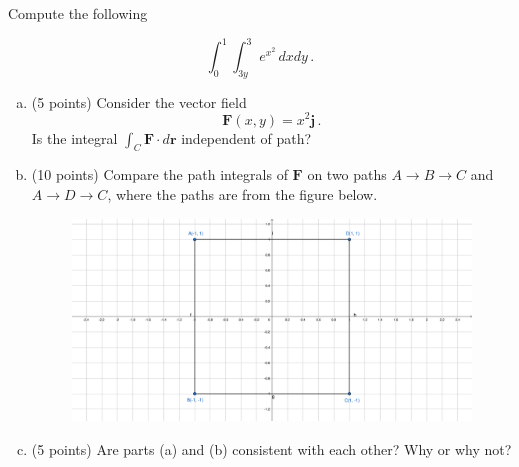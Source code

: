 \documentclass[12pt]{article}
\newcommand{\vect}{\mathbf}
\begin{document}
\newpage
\begin{problem}[16 points]
    Compute the following

            $$\int_0^1 \int_{3y}^3 e^{x^2} \, dx dy \,.$$

\end{problem}

\newpage
\begin{problem}
    \begin{enumerate}[(a)]
        \item (5 points) Consider the vector field
            \begin{equation*}
                \vect{F}(x,y) = x^2 \vect{j} \,.
            \end{equation*}
            Is the integral $\int_C \vect{F} \cdot d\vect{r}$ independent of path?

        \item (10 points)
            Compare
            the path integrals of $\vect{F}$ on two paths $A\to B \to C$ and $A\to D \to C$,
            where the paths are from the figure below.
            \begin{figure}[!h]
            \includegraphics[width=1.5\textwidth]{paths.pdf}
            \end{figure}
    \item (5 points) Are parts (a) and (b) consistent with each other? Why or why not?
    \end{enumerate}

\end{problem}
\end{document}
